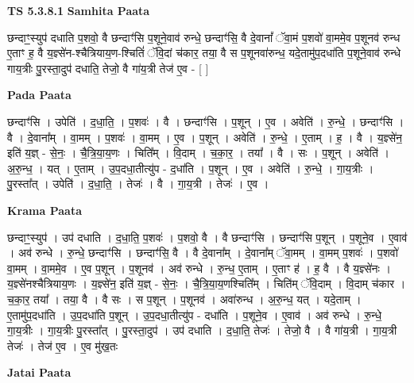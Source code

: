 \documentclass[17pt]{extarticle}
\begin{document}
\textbf{TS 5.3.8.1 } \newline
\textbf{Samhita Paata} \newline

छन्दाꣳ॒॒स्युप॑ दधाति प॒शवो॒ वै छन्दाꣳ॑सि प॒शूने॒वाव॑ रुन्धे॒ छन्दाꣳ॑सि॒ वै दे॒वानां᳚ ॅवा॒मं प॒शवो॑ वा॒ममे॒व प॒शूनव॑ रुन्ध ए॒ताꣳ ह॒ वै य॒ज्ञ्से॑न-श्चैत्रियाय॒ण-श्चितिं॑ ॅवि॒दां च॑कार॒ तया॒ वै स प॒शूनवा॑रुन्ध॒ यदे॒तामु॑प॒दधा॑ति प॒शूने॒वाव॑ रुन्धे गाय॒त्रीः पु॒रस्ता॒दुप॑ दधाति॒ तेजो॒ वै गा॑य॒त्री तेज॑ ए॒व - [  ] \newline

\textbf{Pada Paata} \newline

छन्दाꣳ॑सि । उपेति॑ । द॒धा॒ति॒ । प॒शवः॑ । वै । छन्दाꣳ॑सि । प॒शून् । ए॒व । अवेति॑ । रु॒न्धे॒ । छन्दाꣳ॑सि । वै । दे॒वाना᳚म् । वा॒मम् । प॒शवः॑ । वा॒मम् । ए॒व । प॒शून् । अवेति॑ । रु॒न्धे॒ । ए॒ताम् । ह॒ । वै । य॒ज्ञ्से॑न॒ इति॑ य॒ज्ञ् - से॒नः॒ । चै॒त्रि॒या॒य॒णः । चिति᳚म् । वि॒दाम् । च॒का॒र॒ । तया᳚ । वै । सः । प॒शून् । अवेति॑ । अ॒रु॒न्ध॒ । यत् । ए॒ताम् । उ॒प॒दधा॒तीत्यु॑प - द॒धा॑ति । प॒शून् । ए॒व । अवेति॑ । रु॒न्धे॒ । गा॒य॒त्रीः । पु॒रस्ता᳚त् । उपेति॑ । द॒धा॒ति॒ । तेजः॑ । वै । गा॒य॒त्री । तेजः॑ । ए॒व ।  \newline


\textbf{Krama Paata} \newline

छन्दाꣳ॒॒स्युप॑ । उप॑ दधाति । द॒धा॒ति॒ प॒शवः॑ । प॒शवो॒ वै । वै छन्दाꣳ॑सि । छन्दाꣳ॑सि प॒शून् । प॒शूने॒व । ए॒वाव॑ । अव॑ रुन्धे । रु॒न्धे॒ छन्दाꣳ॑सि । छन्दाꣳ॑सि॒ वै । वै दे॒वाना᳚म् । दे॒वाना᳚म् ॅवा॒मम् । वा॒मम् प॒शवः॑ । प॒शवो॑ वा॒मम् । वा॒ममे॒व । ए॒व प॒शून् । प॒शूनव॑ । अव॑ रुन्धे । रु॒न्ध॒ ए॒ताम् । ए॒ताꣳ ह॑ । ह॒ वै । वै य॒ज्ञ्से॑नः । य॒ज्ञ्से॑नश्चैत्रियाय॒णः । य॒ज्ञ्से॑न॒ इति॑ य॒ज्ञ् - से॒नः॒ । चै॒त्रि॒या॒य॒णश्चिति᳚म् । चिति॑म् ॅवि॒दाम् । वि॒दाम् च॑कार । च॒का॒र॒ तया᳚ । तया॒ वै । वै सः । स प॒शून् । प॒शूनव॑ । अवा॑रुन्ध । अ॒रु॒न्ध॒ यत् । यदे॒ताम् । ए॒तामु॑प॒दधा॑ति । उ॒प॒दधा॑ति प॒शून् । उ॒प॒दधा॒तीत्यु॑प - दधा॑ति । प॒शूने॒व । ए॒वाव॑ । अव॑ रुन्धे । रु॒न्धे॒ गा॒य॒त्रीः । गा॒य॒त्रीः पु॒रस्ता᳚त् । पु॒रस्ता॒दुप॑ । उप॑ दधाति । द॒धा॒ति॒ तेजः॑ । तेजो॒ वै । वै गा॑य॒त्री । गा॒य॒त्री तेजः॑ । तेज॑ ए॒व । ए॒व मु॑ख॒तः \newline

\textbf{Jatai Paata} \newline
\end{document}
